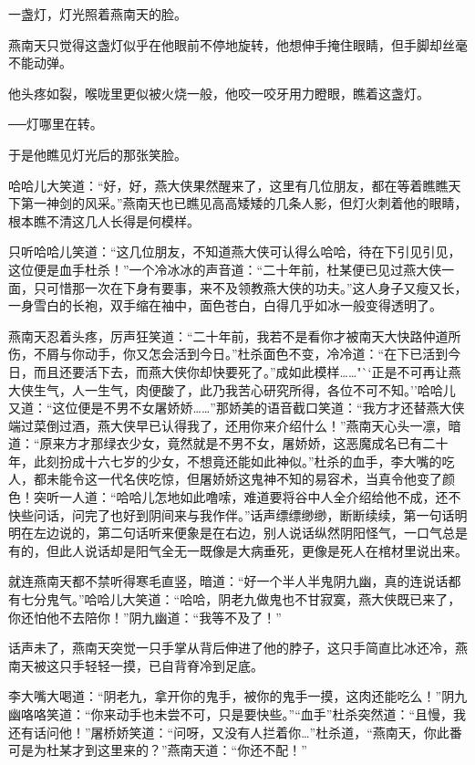 \documentclass[12pt,oneside]{book}
\begin{document}
一盏灯，灯光照着燕南天的脸。

燕南天只觉得这盏灯似乎在他眼前不停地旋转，他想伸手掩住眼睛，但手脚却丝毫不能动弹。

他头疼如裂，喉咙里更似被火烧一般，他咬一咬牙用力瞪眼，瞧着这盏灯。

──灯哪里在转。

于是他瞧见灯光后的那张笑脸。

哈哈儿大笑道：``好，好，燕大侠果然醒来了，这里有几位朋友，都在等着瞧瞧天下第一神剑的风采。''燕南天也已瞧见高高矮矮的几条人影，但灯火刺着他的眼睛，根本瞧不清这几人长得是何模样。

只听哈哈儿笑道：``这几位朋友，不知道燕大侠可认得么哈哈，待在下引见引见，这位便是血手杜杀！''一个冷冰冰的声音道：``二十年前，杜某便已见过燕大侠一面，只可惜那一次在下身有要事，来不及领教燕大侠的功夫。''这人身子又瘦又长，一身雪白的长袍，双手缩在袖中，面色苍白，白得几乎如冰一般变得透明了。

燕南天忍着头疼，厉声狂笑道：``二十年前，我若不是看你才被南天大快路仲道所伤，不屑与你动手，你又怎会活到今日。''杜杀面色不变，冷冷道：``在下已活到今日，而且还要活下去，而燕大侠你却快要死了。''成如此模样\ldots\ldots"``正是不可再让燕大侠生气，人一生气，肉便酸了，此乃我苦心研究所得，各位不可不知。''哈哈儿又道：``这位便是不男不女屠娇娇\ldots\ldots{}''那娇美的语音截口笑道：``我方才还替燕大侠端过菜倒过酒，燕大侠早已认得我了，还用你来介绍什么！''燕南天心头一凛，暗道：``原来方才那绿衣少女，竟然就是不男不女，屠娇娇，这恶魔成名已有二十年，此刻扮成十六七岁的少女，不想竟还能如此神似。''杜杀的血手，李大嘴的吃人，都未能令这一代名侠吃惊，但屠娇娇这鬼神不知的易容术，当真令他变了颜色！突听一人道：``哈哈儿怎地如此噜嗦，难道要将谷中人全介绍给他不成，还不快些问话，问完了也好到阴间来与我作伴。''话声缥缥缈缈，断断续续，第一句话明明在左边说的，第二句话听来便象是在右边，别人说话纵然阴阳怪气，一口气总是有的，但此人说话却是阳气全无一既像是大病垂死，更像是死人在棺材里说出来。

就连燕南天都不禁听得寒毛直竖，暗道：``好一个半人半鬼阴九幽，真的连说话都有七分鬼气。''哈哈儿大笑道：``哈哈，阴老九做鬼也不甘寂寞，燕大侠既已来了，你还怕他不去陪你！''阴九幽道：``我等不及了！''

话声未了，燕南天突觉一只手掌从背后伸进了他的脖子，这只手简直比冰还冷，燕南天被这只手轻轻一摸，已自背脊冷到足底。

李大嘴大喝道：``阴老九，拿开你的鬼手，被你的鬼手一摸，这肉还能吃么！''阴九幽咯咯笑道：``你来动手也未尝不可，只是要快些。''``血手''杜杀突然道：``且慢，我还有话问他！''屠桥娇笑道：``问呀，又没有人拦着你\ldots{}''杜杀道，``燕南天，你此番可是为杜某才到这里来的？''燕南天道：``你还不配！''
\end{document}
